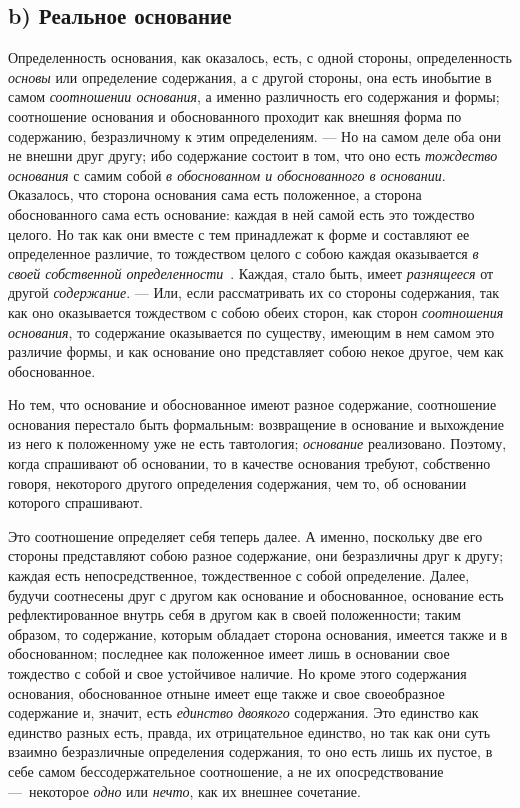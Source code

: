 \subsection[b) Реальное основание]{b) Реальное основание}
Определенность основания, как оказалось, есть, с
одной стороны, определенность {\em основы} или
определение содержания, а с другой стороны, она есть инобытие в самом
{\em соотношении основания}, а именно различность его
содержания и формы; соотношение основания и обоснованного проходит как
внешняя форма по содержанию, безразличному к этим определениям. — Но на
самом деле оба они не внешни друг другу; ибо содержание состоит в том, что
оно есть {\em тождество основания} с самим собой
{\em в обоснованном и обоснованного в основании}.
Оказалось, что сторона основания сама есть положенное, а сторона
обоснованного сама есть основание: каждая в ней самой есть это тождество
целого. Но так как они вместе с тем принадлежат к форме и составляют ее
определенное различие, то тождеством целого с собою каждая оказывается
{\em в своей собственной
определенности}~.
Каждая, стало быть, имеет {\em разнящееся} от другой
{\em содержание}. — Или, если рассматривать их со
стороны содержания, так как оно оказывается тождеством с собою обеих
сторон, как сторон {\em соотношения основания}, то
содержание оказывается по существу, имеющим в нем самом это различие формы,
и как основание оно представляет собою некое другое, чем как обоснованное.

Но тем, что основание и обоснованное имеют разное содержание, соотношение
основания перестало быть формальным: возвращение в основание и выхождение
из него к положенному уже не есть тавтология;
{\em основание} реализовано. Поэтому, когда спрашивают
об основании, то в качестве основания требуют, собственно говоря,
некоторого другого определения содержания, чем то, об основании которого
спрашивают.

Это соотношение определяет себя теперь далее. А именно, поскольку две его
стороны представляют собою разное содержание, они безразличны друг к другу;
каждая есть непосредственное, тождественное с собой определение. Далее,
будучи соотнесены друг с другом как основание и обоснованное, основание
есть рефлектированное внутрь себя в другом как в своей положенности; таким
образом, то содержание, которым обладает сторона основания, имеется также и
в обоснованном; последнее как положенное имеет лишь в основании свое
тождество с собой и свое устойчивое наличие. Но кроме этого содержания
основания, обоснованное отныне имеет еще также и свое своеобразное
содержание и, значит, есть {\em единство двоякого}
содержания. Это единство как единство разных есть, правда, их отрицательное
единство, но так как они суть взаимно безразличные определения содержания,
то оно есть лишь их пустое, в себе самом бессодержательное соотношение, а
не их опосредствование —~некоторое {\em одно} или
{\em нечто}, как их внешнее сочетание.


